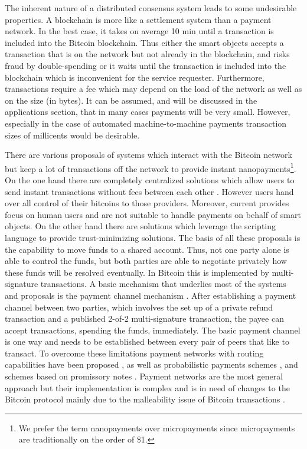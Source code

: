 \documentclass[10pt, conference,compsoc]{IEEEtran}
\begin{document}
The inherent nature of a distributed consensus system leads to some undesirable properties. A blockchain is more like a settlement system than a payment network. In the best case, it takes on average 10 min until a transaction is included into the Bitcoin blockchain. Thus either the smart objects accepts a transaction that is on the network but not already in the blockchain, and risks fraud by double-spending or it waits until the transaction is included into the blockchain which is inconvenient for the service requester. Furthermore, transactions require a fee which may depend on the load of the network as well as on the size (in bytes). It can be assumed, and will be discussed in the applications section, that in many cases payments will be very small. However, especially in the case of automated machine-to-machine payments transaction sizes of millicents would be desirable.   

There are various proposals of systems which interact with the Bitcoin network but keep a lot of transactions off the network to provide instant nanopayments\footnote{We prefer the term nanopayments over micropayments since micropayments are traditionally on the order of \$1.}. On the one hand there are completely centralized solutions which allow users to send instant transactions without fees between each other \cite{coinbase2015,changetip2015}. However users hand over all control of their bitcoins to those providers. Moreover, current provides focus on human users and are not suitable to handle payments on behalf of smart objects. On the other hand there are solutions which leverage the scripting language to provide trust-minimizing solutions. The basis of all these proposals is the capability to move funds to a shared account. Thus, not one party alone is able to control the funds, but both parties are able to negotiate privately how these funds will be resolved eventually. In Bitcoin this is implemented by multi-signature transactions. A basic mechanism that underlies most of the systems and proposals is the payment channel mechanism \cite{channels2015}. After establishing a payment channel between two parties, which involves the set up of a private refund transaction and a published 2-of-2 multi-signature transaction, the payee can accept transactions, spending the funds, immediately. The basic payment channel is one way and needs to be established between every pair of peers that like to transact. To overcome these limitations payment networks with routing capabilities have been proposed \cite{poonbitcoin,decker2015Duplex}, as well as probabilistic payments schemes \cite{passm2015icropayments}, and schemes based on promissory notes \cite{strawpay}. Payment networks are the most general approach but their implementation is complex and is in need of changes to the Bitcoin protocol mainly due to the malleability issue of Bitcoin transactions \cite{malleability2015}.
\end{document}
